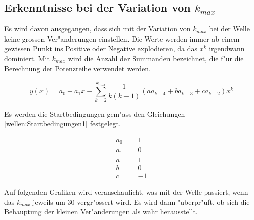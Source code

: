 \begin{refsection}
\section{Erkenntnisse bei der Variation von \texorpdfstring{$k_{max}$}{kmax}}

Es wird davon ausgegangen, dass sich mit der Variation von $k_{max}$ bei der 
Welle keine grossen Ver"anderungen einstellen. Die Werte werden immer ab einem 
gewissen Punkt ins Positive oder Negative explodieren, da das $x^k$ irgendwann 
dominiert. Mit $k_{max}$ wird die Anzahl der Summanden bezeichnet, die f"ur die 
Berechnung der Potenzreihe verwendet werden. 

\begin{equation*}
y(x) = a_0 + a_1x 
-\sum_{k=2}^{k_{max}}\frac{1}{k(k-1)}(aa_{k-4}+ba_{k-3}+ca_{k-2})x^k
\end{equation*}

Es werden die Startbedingungen gem"ass den Gleichungen 
\ref{wellen:Startbedingungen1} festgelegt.

\begin{equation}
	\begin{split}
		a_0 &= 1\\
		a_1 &= 0\\
		a &= 1\\
		b &= 0\\
		c &= -1
	\end{split}
	\label{wellen:Startbedingungen1}
\end{equation}

Auf folgenden Grafiken wird veranschaulicht, was mit der Welle passiert, wenn 
das $k_{max}$ jeweils um 30 vergr"ossert wird. Es wird dann "uberpr"uft, ob 
sich die Behauptung der kleinen Ver"anderungen als wahr herausstellt.


\end{refsection}
